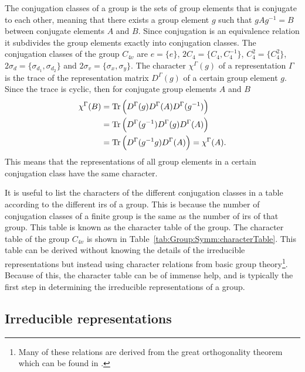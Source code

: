 The conjugation classes of a group is the sets of group elements that is conjugate to each other, meaning that there exists a group element $g$ such
that $gAg^{-1} = B$ between conjugate elements $A$ and $B$. Since conjugation is an equivalence relation it subdivides the group elements
exactly into conjugation classes. The conjugation classes of the group $C_{4v}$ are $e = \{e\}$, $2C_4 = \{C_4,C_4^{-1}\}$, $C_4^2 = \{C_4^2\}$,
$2\sigma_d = \{\sigma_{d_1},\sigma_{d_2}\}$ and $2\sigma_v = \{\sigma_x,\sigma_y\}$. The character $\chi^\Gamma(g)$ of a representation $\Gamma$ is the trace of the representation
matrix $D^\Gamma(g)$ of a certain group element $g$. Since the trace is cyclic, then for conjugate group elements $A$ and $B$
\begin{equation}
    \label{eq:Group:Symm:conjugateCharacter}
    \begin{split}
        \chi^\Gamma(B) &= \operatorname{Tr}\Big(D^\Gamma(g)D^\Gamma(A)D^\Gamma(g^{-1})\Big)\\
        &= \operatorname{Tr}\Big(D^\Gamma(g^{-1})D^\Gamma(g)D^\Gamma(A)\Big)\\
        &= \operatorname{Tr}\Big(D^\Gamma(g^{-1}g)D^\Gamma(A)\Big) = \chi^\Gamma(A).
    \end{split}
\end{equation}
This means that the representations of all group elements in a certain conjugation class have the same character. 

It is useful to list the characters of the different conjugation classes in a table according to the different \ac{ir}s of a group.
This is because the number of conjugation classes of a finite group is the same as the number of \ac{ir}s of that group.
This table is known as the character table of the group. The character table of
the group $C_{4v}$ is shown in Table~\ref{tab:Group:Symm:characterTable}. This table can be derived without knowing the details of the irreducible
representations but instead using character relations from basic group theory\footnote{Many of these relations are derived from the great orthogonality
theorem which can be found \eg in \cite{Inui90}.}. Because of this, the character table can be of immense help, and is typically the first step
in determining the irreducible representations of a group.

\subsection{Irreducible representations}

